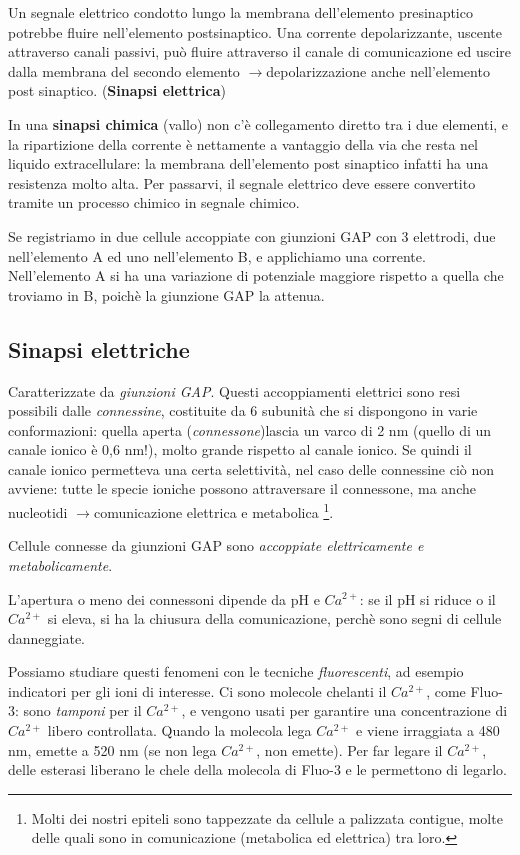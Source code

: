 \documentclass[a4paper,12pt]{article}
\newcommand{\lfreccia}{\ensuremath{\longrightarrow}}
\begin{document}
Un segnale elettrico condotto lungo la membrana dell'elemento presinaptico potrebbe fluire nell'elemento postsinaptico. Una corrente depolarizzante, uscente attraverso canali passivi, può fluire attraverso il canale di comunicazione ed uscire dalla membrana del secondo elemento \lfreccia depolarizzazione anche nell'elemento post sinaptico. (\textbf{Sinapsi elettrica})

In una \textbf{sinapsi chimica} (vallo) non c'è collegamento diretto tra i due elementi, e la ripartizione della corrente è nettamente a vantaggio della via che resta nel liquido extracellulare: la membrana dell'elemento post sinaptico infatti ha una resistenza molto alta. Per passarvi, il segnale elettrico deve essere convertito tramite un processo chimico in segnale chimico.

Se registriamo in due cellule accoppiate con giunzioni GAP con 3 elettrodi, due nell'elemento A ed uno nell'elemento B, e applichiamo una corrente. Nell'elemento A si ha una variazione di potenziale maggiore rispetto a quella che troviamo in B, poichè la giunzione GAP la attenua.

\subsection{Sinapsi elettriche}
Caratterizzate da \emph{giunzioni GAP}. Questi accoppiamenti elettrici sono resi possibili dalle \emph{connessine}, costituite da 6 subunità che si dispongono in varie conformazioni: quella aperta (\emph{connessone})lascia un varco di 2 nm (quello di un canale ionico è 0,6 nm!), molto grande rispetto al canale ionico. Se quindi il canale ionico permetteva una certa selettività, nel caso delle connessine ciò non avviene: tutte le specie ioniche possono attraversare il connessone, ma anche nucleotidi \lfreccia comunicazione elettrica e metabolica \footnote{Molti dei nostri epiteli sono tappezzate da cellule a palizzata contigue, molte delle quali sono in comunicazione (metabolica ed elettrica) tra loro.}.

Cellule connesse da giunzioni GAP sono \emph{accoppiate elettricamente e metabolicamente}.

L'apertura o meno dei connessoni dipende da pH e $Ca^{2+}$: se il pH si riduce o il $Ca^{2+}$ si eleva, si ha la chiusura della comunicazione, perchè sono segni di cellule danneggiate. 

Possiamo studiare questi fenomeni con le tecniche \emph{fluorescenti}, ad esempio indicatori per gli ioni di interesse. Ci sono molecole chelanti il $Ca^{2+}$, come Fluo-3: sono \emph{tamponi} per il $Ca^{2+}$, e vengono usati per garantire una concentrazione di $Ca^{2+}$ libero controllata. Quando la molecola lega $Ca^{2+}$ e viene irraggiata a 480 nm, emette a 520 nm (se non lega $Ca^{2+}$, non emette). Per far legare il $Ca^{2+}$, delle esterasi liberano le chele della molecola di Fluo-3 e le permettono di legarlo.
\end{document}
